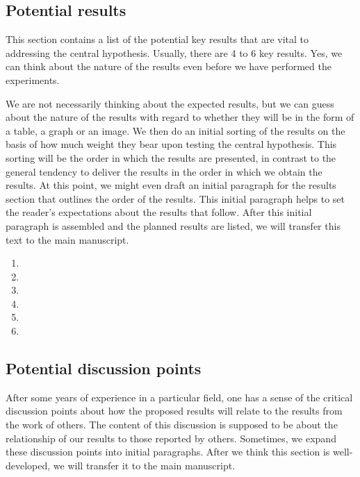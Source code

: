 \documentclass[10pt,letterpaper]{article}
\begin{document}
\subsection{Potential results}
\label{subsec:Results.}

This section contains a list of the potential key results that are vital to addressing the central hypothesis.
Usually, there are 4 to 6 key results. 
Yes, we can think about the nature of the results even before we have performed the experiments.

We are not necessarily thinking about the expected results, but we can guess about the nature of the results with regard to whether they will be in the form of a table, a graph or an image.
We then do an initial sorting of the results on the basis of how much weight they bear upon testing the central hypothesis.
This sorting will be the order in which the results are presented, in contrast to the general tendency to deliver the results in the order in which we obtain the results.
At this point, we might even draft an initial paragraph for the results section that outlines the order of the results.
This initial paragraph helps to set the reader's expectations about the results that follow. 
After this initial paragraph is assembled and the planned results are listed, we will transfer this text to the main manuscript.

\begin{enumerate}
  \item 
  \item
  \item
  \item
  \item
  \item
\end{enumerate}


\subsection{Potential discussion points}
\label{subsec:futureDiscussion}

After some years of experience in a particular field, one has a sense of the critical discussion points about how the proposed results will relate to the results from the work of others.
The content of this discussion is supposed to be about the relationship of our results to those reported by others.
Sometimes, we expand these discussion points into initial paragraphs.
After we think this section is well-developed, we will transfer it to the main manuscript.
\end{document}
